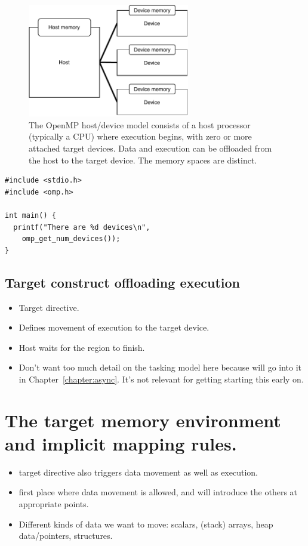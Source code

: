 \begin{figure}[t]
\label{fig:host_device}
\centerline{\includegraphics[width=200pt]{figures/host_device.pdf}}
\caption[The OpenMP host/device model consits of a host processor (typically a CPU) where execution begins, with zero or more attached target devices.
Data and execution can be offloaded from the host to the target device.
The memory spaces are distinct.]
{The OpenMP host/device model consists of a host processor (typically a CPU) where execution begins, with zero or more attached target devices.
Data and execution can be offloaded from the host to the target device.
The memory spaces are distinct.}
\end{figure}

\begin{verbatim}
#include <stdio.h>
#include <omp.h>

int main() {
  printf("There are %d devices\n",
    omp_get_num_devices());
}
\end{verbatim}

\subsection{Target construct offloading execution}
\begin{itemize}
  \item Target directive.
  \item Defines movement of execution to the target device.
  \item Host waits for the region to finish.
  \item Don't want too much detail on the tasking model here because will go into it in Chapter~\ref{chapter:async}. It's not relevant for getting starting this early on.
\end{itemize}

\section{The target memory environment and implicit mapping rules.}
\begin{itemize}
  \item target directive also triggers data movement as well as execution.
  \item first place where data movement is allowed, and will introduce the others at appropriate points.
  \item Different kinds of data we want to move: scalars, (stack) arrays, heap data/pointers, structures.
\end{itemize}

